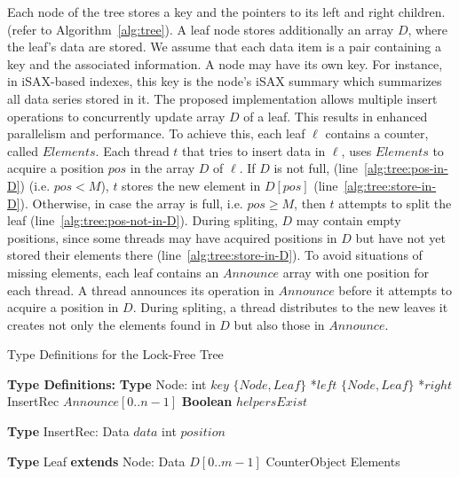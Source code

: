     Each node of the tree stores a key and the pointers
    to its left and right children.  (refer to Algorithm~\ref{alg:tree}).
    A leaf node stores additionally an array $D$, where the leaf's data are stored. 
    We assume that each data item is a pair containing a key and the associated information.
    A node may have its own key. For instance, in iSAX-based indexes, this key is the node's
    iSAX summary which summarizes all data series stored in it.
    The proposed implementation allows multiple insert operations to concurrently update array
    $D$ of a leaf. This results in enhanced parallelism and performance. 
    To achieve this, each leaf $\ell$ contains a counter, called $\mathit{Elements}$.
    Each thread $\mathit{t}$ that tries to insert data in $\ell$, uses
    $\mathit{Elements}$ to acquire a position $\mathit{pos}$ in the array $D$ of $\ell$.
    If $D$ is not full, (line~\ref{alg:tree:pos-in-D}) (i.e. $\mathit{pos} < M$), 
    $\mathit{t}$ stores the new element in $D[\mathit{pos}]$ (line~\ref{alg:tree:store-in-D}).
    Otherwise, in case the array is full, i.e. $\mathit{pos \geq M}$, then 
    $\mathit{t}$ attempts to split the leaf (line~\ref{alg:tree:pos-not-in-D}). 
    During spliting, $D$ may contain empty positions, since some
    threads may have acquired positions in $D$ but have not yet stored their
    elements there (line~\ref{alg:tree:store-in-D}).
    To avoid situations of missing elements, each leaf contains an $\mathit{Announce}$ array 
    with one position for each thread. A thread announces its operation
    in $\mathit{Announce}$ before it attempts to acquire a position in $D$.
    During spliting, a thread distributes to the new leaves it creates not only the
    elements found in $D$ but also those in $\mathit{Announce}$.

    \begin{algorithm}[t]
        \footnotesize
        \caption{Type Definitions for the Lock-Free Tree}
        \label{alg:tree-types}
        \begin{algorithmic}[1]
            \Statex \textbf{Type Definitions:}
            \State \textbf{Type} Node:
            \State \quad int $\mathit{key}$
            \State \quad $\{Node,Leaf\}$ *$\mathit{left}$
            \State \quad $\{Node,Leaf\}$ *$\mathit{right}$
            \State \quad InsertRec $\mathit{Announce}[0..n-1]$
            \State \quad \textbf{Boolean} $\mathit{helpersExist}$
    
            \Statex
            \State \textbf{Type} InsertRec:
            \State \quad Data $\mathit{data}$
            \State \quad int $\mathit{position}$
    
            \Statex
            \State \textbf{Type} Leaf \textbf{extends} Node:
            \State \quad Data $D[0..m-1]$
            \State \quad CounterObject Elements
        \end{algorithmic}
    \end{algorithm}
    


